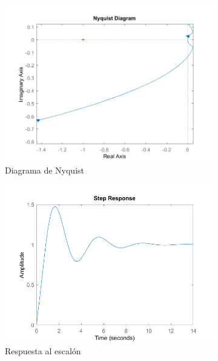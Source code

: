 \documentclass[a4paper]{article}
\begin{document}
\begin{figure}[htp]
	\begin{center}
		\begin{subfigure}[b]{0.45\textwidth}
			\centering
			\includegraphics[width=\textwidth]{nyquist2}
			\caption{Diagrama de Nyquist}
		\end{subfigure}
		\begin{subfigure}[b]{0.45\textwidth}
			\centering
			\includegraphics[width=\textwidth]{respuesta}
			\caption{Respuesta al escalón}
			\label{escalonteorico}
		\end{subfigure}
	\end{center}
	\caption{}
	\label{fig:sim}
\end{figure}
\end{document}
